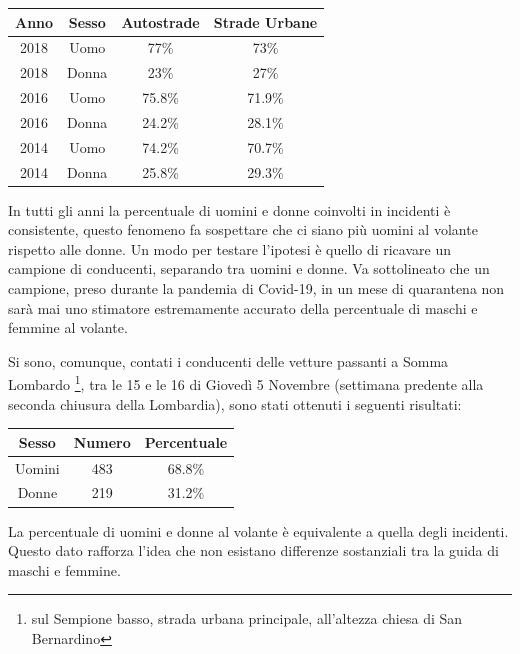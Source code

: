 \documentclass[a4paper]{report}
\begin{document}
\begin{center}
    \def\arraystretch{1.5}%
    \begin{tabular}{ |c|c|c|c| }
        \hline
        Anno & Sesso & Autostrade & Strade Urbane \\ 
        \hline
        \rowcolor{TableGray}
        2018 & Uomo & 77\%  & 73\% \\
        2018 & Donna & 23\% & 27\% \\
        \rowcolor{TableGray}
        2016 & Uomo & 75.8\%  & 71.9\% \\
        2016 & Donna & 24.2\% & 28.1\% \\
        \rowcolor{TableGray}
        2014 & Uomo & 74.2\%  & 70.7\% \\
        2014 & Donna & 25.8\% & 29.3\% \\
        \hline
    \end{tabular}
\end{center}

In tutti gli anni la percentuale di uomini e donne coinvolti in incidenti è consistente, 
questo fenomeno fa sospettare che ci siano più uomini al volante rispetto alle donne.
Un modo per testare l'ipotesi è quello di ricavare un campione di conducenti, separando tra 
uomini e donne.
Va sottolineato che un campione, preso durante la pandemia di Covid-19, in un mese di quarantena 
non sarà mai uno stimatore estremamente accurato della percentuale di maschi e femmine al volante.

Si sono, comunque, contati i conducenti delle vetture passanti a Somma Lombardo
\footnote{sul Sempione basso, strada urbana principale, all'altezza chiesa di San Bernardino}, 
tra le 15 e le 16 di Giovedì 5 Novembre 
(settimana predente alla seconda chiusura della Lombardia), 
sono stati ottenuti i seguenti risultati:

\begin{center}
    \def\arraystretch{1.5}%
    \begin{tabular}{ |c|c|c| }
        \hline
        Sesso & Numero & Percentuale \\ 
        \hline
        \rowcolor{TableGray}
        Uomini & 483 & 68.8\% \\
        Donne & 219 & 31.2\% \\
        \hline
    \end{tabular}
\end{center}

La percentuale di uomini e donne al volante è equivalente a quella degli incidenti.
Questo dato rafforza l'idea che non esistano differenze sostanziali tra la guida di 
maschi e femmine.
\end{document}
